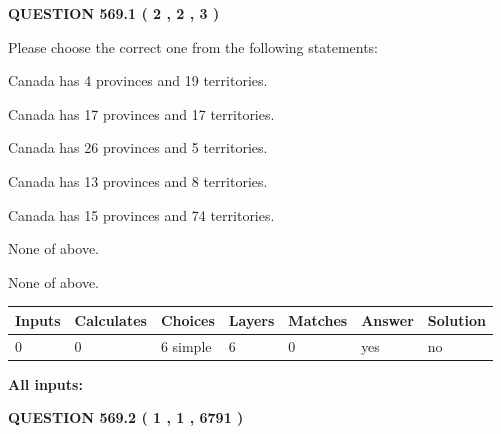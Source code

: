 \documentclass[12pt]{article}
\begin{document}
\vspace{0.2in}
  
{\textbf{\Large{QUESTION
569.1 
 ( 2 , 2 , 3 )
}}}
  
  
Please choose the correct one from the following statements:
 
 
Canada has   4 provinces and  19 territories.
 
 
Canada has  17 provinces and  17 territories.
 
 
Canada has  26 provinces and  5 territories.
 
 
Canada has  13 provinces and  8 territories.
 
 
Canada has  15 provinces and  74 territories.
 
 
 None of above.
 
 
\noindent{}
 
 
 None of above.
 
 
\noindent{}
 
 
   
   
   
   
\noindent\begin{tabular}{|l|l|l|l|l|l|l|}
 \hline
Inputs & Calculates & Choices & Layers & Matches & Answer & Solution \\ \hline
 0  & 
 0  & 
 6
  simple  
  & 
 6  & 
 0  & 
  yes & 
  no 
  \\ \hline
 \end{tabular}
   
   
   
   
\noindent{}
   
   
   
   
\noindent\vspace{0.1in}\hspace{-0.08in} {\textbf{\Large{All inputs: }}}
   
   
  
\vspace{0.2in}
  
{\textbf{\Large{QUESTION
569.2 
 ( 1 , 1 , 6791 )
}}}
  
\end{document}

